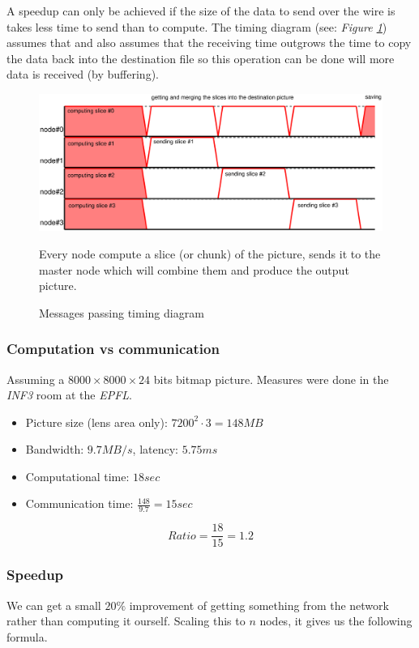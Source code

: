 \documentclass[10pt,a4paper]{article}
\begin{document}
A speedup can only be achieved if the size of the data to send over the wire is
takes less time to send than to compute. The timing diagram (see: \emph{Figure
\ref{fig:mpi}}) assumes that and also assumes that the receiving time outgrows
the time to copy the data back into the destination file so this operation can
be done will more data is received (by buffering).

\begin{figure}[h]
    \centering
    \includegraphics[width=0.9\linewidth]{../figures/mpi.eps}
    \caption{Messages passing timing diagram}{\small Every node compute a slice
    (or chunk) of the picture, sends it to the master node which will combine
    them and produce the output picture.}
    \label{fig:mpi}
\end{figure}

\subsubsection{Computation vs communication}
Assuming a $8000\times8000\times24$ bits bitmap picture. Measures were done in
the \emph{INF3} room at the \emph{EPFL}.

\begin{itemize}
    \item Picture size (lens area only): $7200^2 \cdot 3 = 148 MB$
    \item Bandwidth: $9.7 MB/s$, latency: $5.75 ms$
    \item Computational time: $18 sec$
    \item Communication time: $\frac{148}{9.7} = 15 sec$
\end{itemize}

$$Ratio = \frac{18}{15} = 1.2$$

\subsubsection{Speedup}

We can get a small $20\%$ improvement of getting something from the network
rather than computing it ourself. Scaling this to $n$ nodes, it gives us the
following formula.
\end{document}
